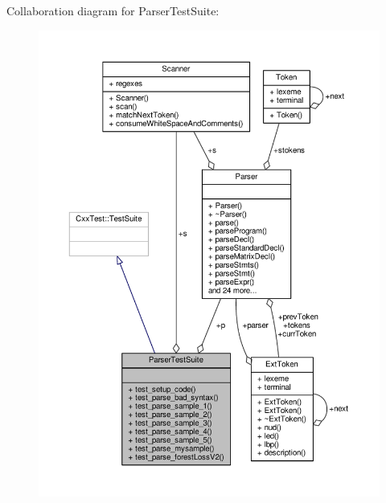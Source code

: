 Collaboration diagram for Parser\-Test\-Suite\-:\nopagebreak
\begin{figure}[H]
\begin{center}
\leavevmode
\includegraphics[width=350pt]{classParserTestSuite__coll__graph}
\end{center}
\end{figure}
